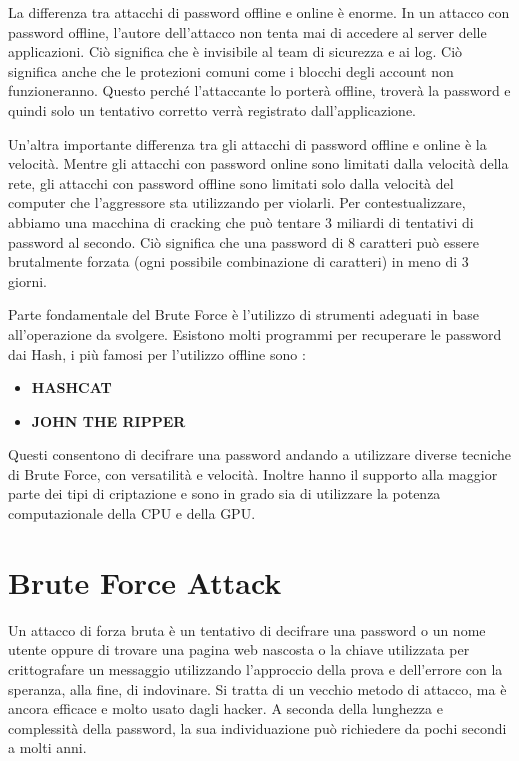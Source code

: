 La differenza tra attacchi di password offline e online è enorme. In un attacco con password offline, l'autore dell'attacco non tenta mai di accedere al server delle applicazioni. Ciò significa che è invisibile al team di sicurezza e ai log. Ciò significa anche che le protezioni comuni come i blocchi degli account non funzioneranno. Questo perché l'attaccante lo porterà offline, troverà la password e quindi solo un tentativo corretto verrà registrato dall'applicazione.

Un'altra importante differenza tra gli attacchi di password offline e online è la velocità. Mentre gli attacchi con password online sono limitati dalla velocità della rete, gli attacchi con password offline sono limitati solo dalla velocità del computer che l'aggressore sta utilizzando per violarli. Per contestualizzare, abbiamo una macchina di cracking che può tentare 3 miliardi di tentativi di password al secondo. Ciò significa che una password di 8 caratteri può essere brutalmente forzata (ogni possibile combinazione di caratteri) in meno di 3 giorni.

Parte fondamentale del Brute Force è l'utilizzo di strumenti adeguati in base all'operazione da svolgere.
Esistono molti programmi per recuperare le password dai Hash, i più famosi per l'utilizzo offline sono :
\begin{itemize}
    \item \textbf{HASHCAT}\cite{hashcat}
    \item \textbf{JOHN THE RIPPER}\cite{John_The_Ripper}
\end{itemize}
Questi consentono di decifrare una password andando a utilizzare diverse tecniche di Brute Force, con versatilità e velocità.
Inoltre hanno il supporto alla maggior parte dei tipi di criptazione e sono in grado sia di utilizzare la potenza computazionale della CPU e della GPU.

\section{Brute Force Attack}
Un attacco di forza bruta \cite{Brute_attack}\cite{Brute_attack2} è un tentativo di decifrare una password o un nome utente oppure di trovare una pagina web nascosta o la chiave utilizzata per crittografare un messaggio utilizzando l'approccio della prova e dell'errore con la speranza, alla fine, di indovinare. Si tratta di un vecchio metodo di attacco, ma è ancora efficace e molto usato dagli hacker.
A seconda della lunghezza e complessità della password, la sua individuazione può richiedere da pochi secondi a molti anni.

